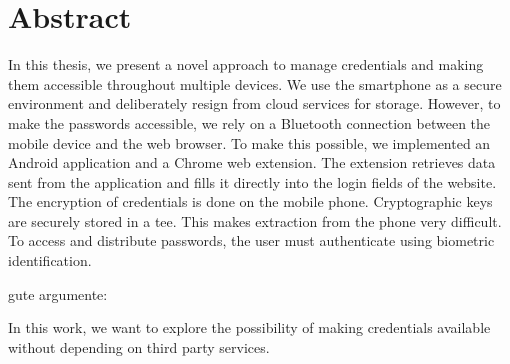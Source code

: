 
\section*{Abstract} \label{cha:abstract}
In this thesis, we present a novel approach to manage credentials and making them accessible throughout multiple devices. We use the smartphone as a secure environment and deliberately resign from cloud services for storage. However, to make the passwords accessible, we rely on a Bluetooth connection between the mobile device and the web browser. To make this possible, we implemented an Android application and a Chrome web extension. The extension retrieves data sent from the application and fills it directly into the login fields of the website. \\
The encryption of credentials is done on the mobile phone. Cryptographic keys are securely stored in a \gls{tee}. This makes extraction from the phone very difficult. To access and distribute passwords, the user must authenticate using biometric identification.


gute argumente:

In this work, we want to explore the possibility of making credentials available without depending on third party services. 

